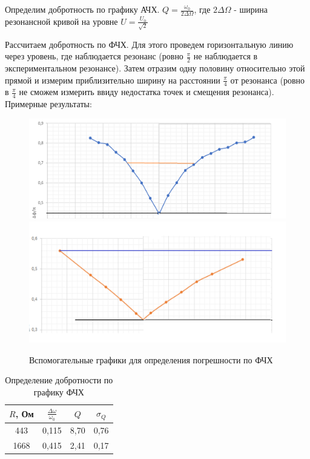 \documentclass[a4paper, 12pt]{article}
\begin{document}
	Определим добротность по графику АЧХ. $Q = \frac{\omega_0}{2\Delta \Omega}$, где $2\Delta \Omega$ - ширина резонансной кривой на уровне $U = \frac{U_0}{\sqrt{2}}$
	
	Рассчитаем добротность по ФЧХ. Для этого проведем горизонтальную линию через уровень, где наблюдается резонанс (ровно $\frac{\pi}{2}$ не наблюдается в экспериментальном резонансе). Затем отразим одну половину относительно этой прямой и измерим приблизительно ширину на расстоянии $\frac{\pi}{4}$ от резонанса (ровно в $\frac{\pi}{4}$ не сможем измерить ввиду недостатка точек и смещения резонанса).
	Примерные результаты:
	
	\begin{figure}[h]
		\centering
		\includegraphics[width = \textwidth]{Gr6}
		\includegraphics[width = \textwidth]{Gr5}
		\caption{Вспомогательные графики для определения погрешности по ФЧХ}
	\end{figure}
	
	\begin{table}[h]
	\centering
	\begin{tabular}{|c|c|c|c|}
		\hline
		$R$, Ом & $\frac{\Delta \omega}{\omega_0}$ & $Q$ & $\sigma_{Q}$ \\ \hline
		443 & 0,115 & 8,70 & 0,76 \\ \hline
		1668 & 0,415 & 2,41 & 0,17 \\ \hline  
	\end{tabular}
	\caption{Определение добротности по графику ФЧХ}
	\end{table}
	
\end{document}
